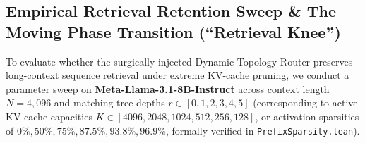 \documentclass[11pt,a4paper]{article}
\begin{document}
\subsection{Empirical Retrieval Retention Sweep \& The Moving Phase Transition (``Retrieval Knee'')}
\label{sec:niah}

To evaluate whether the surgically injected Dynamic Topology Router preserves long-context sequence retrieval under extreme KV-cache pruning, we conduct a parameter sweep on \textbf{Meta-Llama-3.1-8B-Instruct} across context length $N = 4{,}096$ and matching tree depths $r \in [0, 1, 2, 3, 4, 5]$ (corresponding to active KV cache capacities $K \in [4096, 2048, 1024, 512, 256, 128]$, or activation sparsities of $0\%, 50\%, 75\%, 87.5\%, 93.8\%, 96.9\%$, formally verified in \texttt{PrefixSparsity.lean}).
\end{document}
